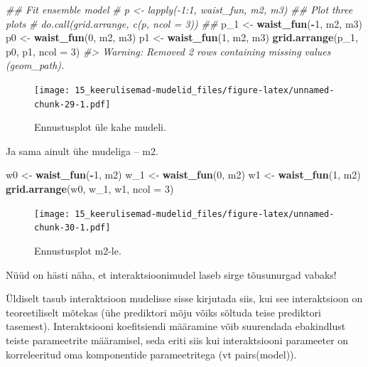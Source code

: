 \documentclass[]{book}
\newenvironment{Shaded}{\begin{snugshade}}{\end{snugshade}}
\newcommand{\CommentTok}[1]{\textcolor[rgb]{0.56,0.35,0.01}{\textit{#1}}}
\newcommand{\DataTypeTok}[1]{\textcolor[rgb]{0.13,0.29,0.53}{#1}}
\newcommand{\DecValTok}[1]{\textcolor[rgb]{0.00,0.00,0.81}{#1}}
\newcommand{\KeywordTok}[1]{\textcolor[rgb]{0.13,0.29,0.53}{\textbf{#1}}}
\newcommand{\NormalTok}[1]{#1}
\newcommand{\OperatorTok}[1]{\textcolor[rgb]{0.81,0.36,0.00}{\textbf{#1}}}
\newcommand{\StringTok}[1]{\textcolor[rgb]{0.31,0.60,0.02}{#1}}
\begin{document}
\begin{Shaded}
\begin{Highlighting}[]
\CommentTok{## Fit ensemble model}
\CommentTok{# p <- lapply(-1:1, waist_fun, m2, m3)}
\CommentTok{## Plot three plots}
\CommentTok{# do.call(grid.arrange, c(p, ncol = 3))}
\CommentTok{## }
\NormalTok{p_}\DecValTok{1}\NormalTok{ <-}\StringTok{ }\KeywordTok{waist_fun}\NormalTok{(}\OperatorTok{-}\DecValTok{1}\NormalTok{, m2, m3)}
\NormalTok{p0 <-}\StringTok{ }\KeywordTok{waist_fun}\NormalTok{(}\DecValTok{0}\NormalTok{, m2, m3)}
\NormalTok{p1 <-}\StringTok{ }\KeywordTok{waist_fun}\NormalTok{(}\DecValTok{1}\NormalTok{, m2, m3)}
\KeywordTok{grid.arrange}\NormalTok{(p_}\DecValTok{1}\NormalTok{, p0, p1, }\DataTypeTok{ncol =} \DecValTok{3}\NormalTok{)}
\CommentTok{#> Warning: Removed 2 rows containing missing values (geom_path).}
\end{Highlighting}
\end{Shaded}

\begin{figure}
\centering
\texttt{[image: 15\_keerulisemad-mudelid\_files/figure-latex/unnamed-chunk-29-1.pdf]}
\caption{\label{fig:unnamed-chunk-29}Ennustusplot üle kahe mudeli.}
\end{figure}

Ja sama ainult ühe mudeliga -- m2.

\begin{Shaded}
\begin{Highlighting}[]
\NormalTok{w0 <-}\StringTok{ }\KeywordTok{waist_fun}\NormalTok{(}\OperatorTok{-}\DecValTok{1}\NormalTok{, m2)}
\NormalTok{w_}\DecValTok{1}\NormalTok{ <-}\StringTok{ }\KeywordTok{waist_fun}\NormalTok{(}\DecValTok{0}\NormalTok{, m2)}
\NormalTok{w1 <-}\StringTok{ }\KeywordTok{waist_fun}\NormalTok{(}\DecValTok{1}\NormalTok{, m2)}
\KeywordTok{grid.arrange}\NormalTok{(w0, w_}\DecValTok{1}\NormalTok{, w1, }\DataTypeTok{ncol =} \DecValTok{3}\NormalTok{)}
\end{Highlighting}
\end{Shaded}

\begin{figure}
\centering
\texttt{[image: 15\_keerulisemad-mudelid\_files/figure-latex/unnamed-chunk-30-1.pdf]}
\caption{\label{fig:unnamed-chunk-30}Ennustusplot m2-le.}
\end{figure}

Nüüd on hästi näha, et interaktsioonimudel laseb sirge tõusunurgad vabaks!

Üldiselt tasub interaktsioon mudelisse sisse kirjutada siis, kui see interaktsioon on teoreetiliselt mõtekas (ühe prediktori mõju võiks sõltuda teise prediktori tasemest).
Interaktsiooni koefitsiendi määramine võib suurendada ebakindlust teiste parameetrite määramisel, seda eriti siis kui interaktsiooni parameeter on korreleeritud oma komponentide parameetritega (vt pairs(model)).
\end{document}
